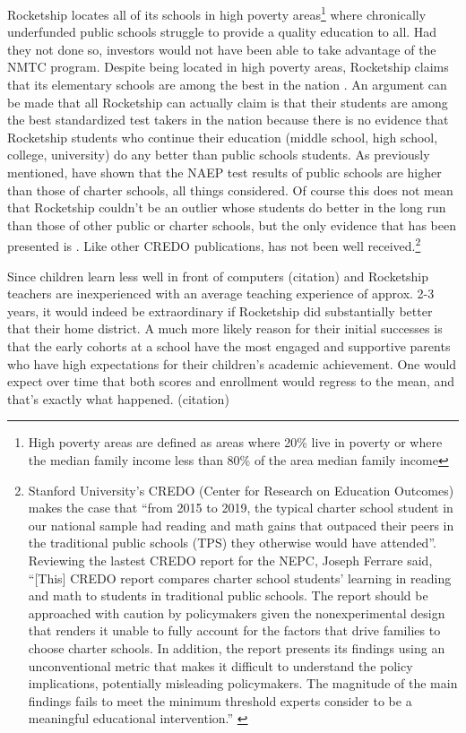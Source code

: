 Rocketship locates all of its schools in high poverty areas\footnote{High poverty areas are defined as areas where 20\% live in poverty or where the median family income less than 80\% of the area median family income\parencite[13-14]{CDFI2020}} where chronically underfunded public schools struggle to provide a quality education to all. Had they not done so, investors would not have been able to take advantage of the NMTC program. Despite being located in high poverty areas, Rocketship claims that its elementary schools are among the best in the nation \parencite{Abousalem2021}. An argument can be made that all Rocketship can actually claim is that their students are among the best standardized test takers in the nation because there is no evidence that Rocketship students who continue their education (middle school, high school, college, university) do any better than public schools students. As previously mentioned, \textcite{Lubienski.Lubienski2014} have shown that the NAEP test results of public schools are higher than those of charter schools, all things considered. Of course this does not mean that Rocketship couldn't be an outlier whose students do better in the long run than those of other public or charter schools, but the only evidence that has been presented is \textcite{Raymond.etal2023}. Like other CREDO publications, \textcite{Raymond.etal2023} has not been well received.\footnote{Stanford University's CREDO (Center for Research on Education Outcomes) makes the case that ``from 2015 to 2019, the typical charter school student in our national sample had reading and math gains that outpaced their peers in the traditional public schools (TPS) they otherwise would have attended''. Reviewing the lastest CREDO report for the NEPC, Joseph Ferrare said, ``[This] CREDO report compares charter school students’ learning in reading and math to students in traditional public schools. The report should be approached with caution by policymakers given the nonexperimental design that renders it unable to fully account for the factors that drive families to choose charter schools. In addition, the report presents its findings using an unconventional metric that makes it difficult to understand the policy implications, potentially misleading policymakers. The magnitude of the main findings fails to meet the minimum threshold experts consider to be a meaningful educational intervention.'' \parencite{Ferrare2023}}

Since children learn less well in front of computers (citation) and Rocketship teachers are inexperienced with an average teaching experience of approx. 2-3 years, it would indeed be extraordinary if Rocketship did substantially better that their home district. A much more likely reason for their initial successes is that the early cohorts at a school have the most engaged and supportive parents who have high expectations for their children's academic achievement. One would expect over time that both scores and enrollment would regress to the mean, and that's exactly what happened. (citation)

